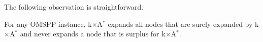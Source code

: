 \documentclass[smallextended]{svjour3}       %
\newcommand{\omspp}{\ac{OMSPP}\xspace}
\newcommand{\kastarvar}[1]{\textup{kA}$^*_{#1}$\xspace}
\newcommand{\kastarmin}{\kastarvar{\min}}
\newcommand{\kastarphi}{\textup{kA}$^*_{\Phi}$\xspace}
\newcommand{\kxastar}{k$\times$A$^*$\xspace}
\newcommand{\axiomadm}{admissible\xspace}
\newcommand{\vect}[1]{\mathbf{#1}}
\newcommand{\abda}[1]{\textbf{[AS:#1]}}
\begin{document}

The following observation is straightforward.
\begin{proposition}
  \label{prop:kxastar-effective}
  For any \omspp instance, \kxastar expands all nodes that are surely expanded by \kxastar
  and never expands a node that is surplus for \kxastar.
\end{proposition}




\end{document}
